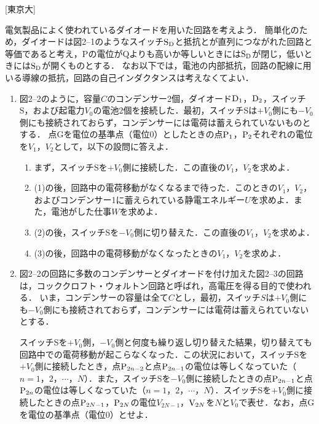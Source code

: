 



\noindent{} [東京大]

電気製品によく使われているダイオードを用いた回路を考えよう．
簡単化のため，ダイオードは図2--1のようなスイッチ$\mathrm{S}_\mathrm{D}$と抵抗とが直列につながれた回路と等価であると考え，Pの電位がQよりも高いか等しいときには$\mathrm{S}_\mathrm{D}$が閉じ，低いときには$\mathrm{S}_\mathrm{D}$が開くものとする．
なお以下では，電池の内部抵抗，回路の配線に用いる導線の抵抗，回路の自己インダクタンスは考えなくてよい．

\begin{enumerate}[label=\Roman*]
  \setlength{\parindent}{1\zw}
  \setlength{\labelsep}{2\zw}
  \setlength{\itemindent}{1\zw}
  \item 図2--2のように，容量$C$のコンデンサー2個，ダイオード$\mathrm{D}_1$，$\mathrm{D}_2$，スイッチS，および起電力$V_0$の電池2個を接続した．最初，スイッチSは$+V_0$側にも$-V_0$側にも接続されておらず，コンデンサーには電荷は蓄えられていないものとする．
    点Gを電位の基準点（電位0）としたときの点$\mathrm{P}_1$，$\mathrm{P}_2$それぞれの電位を$V_1$，$V_2$として，以下の設問に答えよ．
    \begin{enumerate}[(1)]
    \setlength{\labelsep}{1\zw}
      \item まず，スイッチSを$+V_0$側に接続した．この直後の$V_1$，$V_2$を求めよ．
      \item (1)の後，回路中の電荷移動がなくなるまで待った．このときの$V_1$，$V_2$，およびコンデンサー1に蓄えられている静電エネルギー$U$を求めよ．また，電池がした仕事$W$を求めよ．
      \item (2)の後，スイッチSを$-V_0$側に切り替えた．この直後の$V_1$，$V_2$を求めよ．
      \item (3)の後，回路中の電荷移動がなくなったときの$V_1$，$V_2$を求めよ．
    \end{enumerate}
  \item 図2--2の回路に多数のコンデンサーとダイオードを付け加えた図2--3の回路は，コッククロフト・ウォルトン回路と呼ばれ，高電圧を得る目的で使われる．
    いま，コンデンサーの容量は全て$C$とし，最初，スイッチ$S$は$+V_0$側にも$-V_0$側にも接続されておらず，コンデンサーには電荷は蓄えられていないとする．

    スイッチSを$+V_0$側，$-V_0$側と何度も繰り返し切り替えた結果，切り替えても回路中での電荷移動が起こらなくなった．この状況において，スイッチSを$+V_0$側に接続したとき，点$\mathrm{P}_{2n-2}$と点$\mathrm{P}_{2n-1}$の電位は等しくなっていた（$n = 1$，$2$，$\cdots$，$N$）．また，スイッチSを$-V_0$側に接続したときの点$\mathrm{P}_{2n-1}$と点$\mathrm{P}_{2n}$の電位は等しくなっていた（$n = 1$，$2$，$\cdots$，$N$）．スイッチSを$+V_0$側に接続したときの点$\mathrm{P}_{2N-1}$，$\mathrm{P}_{2N}$の電位$V_{2N-1}$，$\mathrm{V}_{2N}$を$N$と$V_0$で表せ．なお，点Gを電位の基準点（電位0）とせよ．
\end{enumerate}
